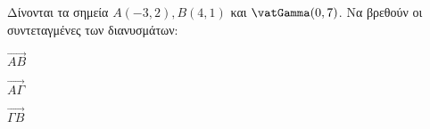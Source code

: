 Δίνονται τα σημεία $ A(-3,2),B(4,1) $ και $ \vatGamma(0,7) $. Να βρεθούν οι συντεταγμένες των διανυσμάτων:
\begin{multicols}{3}
\begin{alist}
\item $ \overrightarrow{AB} $
\item $ \overrightarrow{A\varGamma} $
\item $ \overrightarrow{\varGamma B} $
\end{alist}
\end{multicols}
